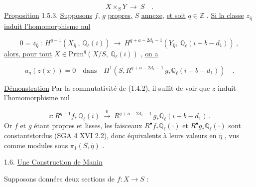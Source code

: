 \begin{equation}\tag{1.5.2}
X \times_S Y \ \longrightarrow \ S \quad .
\end{equation}
\underline{Proposition} 1.5.3. \underline{Supposons} $f$, $g$ \underline{propres,} $S$ \underline{annexe}, \underline{et soit} $q \in \mathbb{Z}$ . \underline{Si la classe} $z_{\bar{\eta}}$ \underline{induit l'homomorphisme nul}

\begin{equation}\tag{1.5.3}
0 = z_{\bar{\eta}} \ : \ H^{q-1}(X_{\bar{\eta}} \ , \ \mathbb{Q}_\ell(i)) \ \longrightarrow \ H^{q+a-2d_1-1}(Y_{\bar{\eta}}, \ \mathbb{Q}_\ell(i+b-d_1)) \ ,
\end{equation}
\underline{alors, pour tout} $X \in \mathrm{Prim}^{q}(X/S,\ \mathbb{Q}_\ell(i))$ , \underline{on a}

\begin{equation}\tag{1.5.4}
u_g(z(x)) = 0 \quad \mathrm{dans} \quad H^{1}(S, R^{q+a-2d_1-1}\,g_*\mathbb{Q}_\ell(i+b-d_1)) \quad .
\end{equation}


\underline{Démonstration} Par la commutativité de (1.4.2), il suffit de voir que $z$ induit l'homomorphisme nul

\begin{equation}\tag{1.5.5}
z : R^{q-1}f_*\,\mathbb{Q}_\ell(i) \ \stackrel{0}{\longrightarrow} \ R^{q+a-2d_1-1}\,g_*\mathbb{Q}_\ell(i+b-d_1)\,.
\end{equation}
Or $f$ et $g$ étant propres et lisses, les faisceaux $R^{\bullet}f_*\mathbb{Q}_\ell(\cdot)$ et $R^{\bullet}g_*\mathbb{Q}_\ell(\cdot)$ sont constantstordus (SGA 4 XVI 2.2), donc équivalents à leurs valeurs en $\bar{\eta}$ , vus comme modules sous $\pi_1(S, \bar{\eta})$ .

1.6. \underline{Une Construction de Manin}

Supposons données deux sections de $f : X \longrightarrow S$ :

